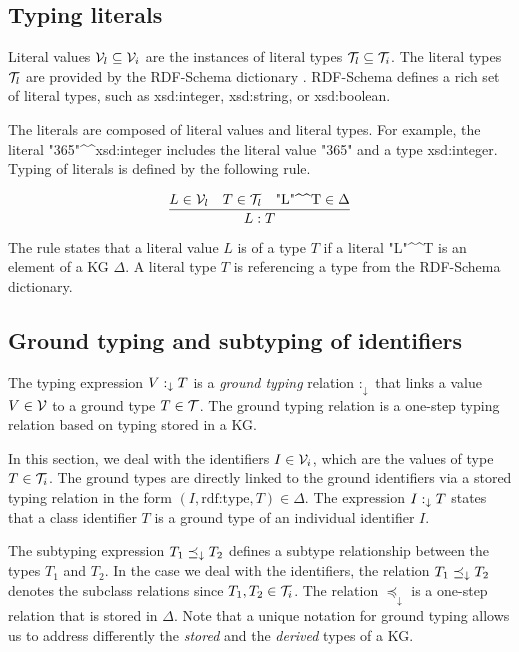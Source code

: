 \documentclass[runningheads]{llncs}
\newcommand{\darr}{\downarrow}
\newcommand{\V}{{\cal V}}
\newcommand{\T}{{\cal T}}
\begin{document}
\subsection{Typing literals\label{sec:literals}}

Literal values $\V_l\subseteq\V_i$ are the instances of literal types
$\T_l\subseteq\T_i$. The literal types $\T_l$ are provided by the
RDF-Schema dictionary \cite{rdfschema}. RDF-Schema defines a rich set
of literal types, such as xsd:integer, xsd:string, or xsd:boolean.

The literals are composed of literal values and literal types. For
example, the literal
"365"\textasciicircum\textasciicircum\/xsd:integer includes the
literal value "365" and a type xsd:integer. Typing of literals is
defined by the following rule.

\begin{equation}
\dfrac{L\in\V_l\quad T\in\T_l\quad \text{"L"\textasciicircum\textasciicircum\/T}\in\Delta}
      {L:T}  
\end{equation}

The rule states that a literal value $L$ is of a type $T$ if a literal
"L"\textasciicircum\textasciicircum\/T is an element of a KG
$\Delta$. A literal type $T$ is referencing a type from the RDF-Schema
dictionary.






\subsection{Ground typing and subtyping of identifiers\label{sec:idents-stored}}

The typing expression $V:_\darr\/T$ is a \emph{ground typing} relation
$:_\darr$ that links a value $V\in\V$ to a ground type $T\in\T$. The
ground typing relation is a one-step typing relation based on typing
stored in a KG.

In this section, we deal with the identifiers $I\in\V_i$, which are the
values of type $T\in\T_i$. The ground types are directly linked to the
ground identifiers via a stored typing relation in the form
$(I,\text{rdf:type},T)\in\Delta$. The expression $I:_\darr\/T$ states that a
class identifier $T$ is a ground type of an individual identifier $I$.

The subtyping expression $T_1\preceq_\darr\/T_2$ defines a subtype
relationship between the types $T_1$ and $T_2$. In the case we deal
with the identifiers, the relation $T_1\preceq_\darr\/T_2$ denotes the
subclass relations since $T_1,T_2\in\T_i$. The relation $\preceq_\darr$ is
a one-step relation that is stored in $\Delta$. Note that a unique
notation for ground typing allows us to address differently the
\emph{stored} and the \emph{derived} types of a KG.
\end{document}
